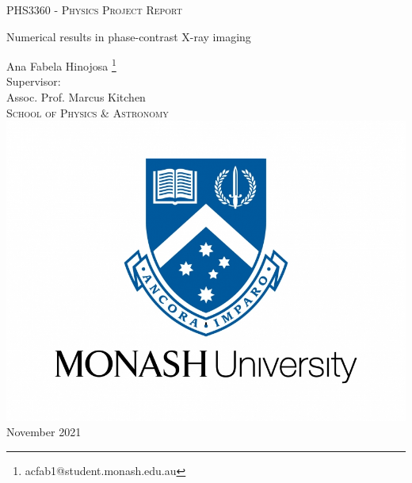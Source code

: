 \documentclass[10pt, a4paper, singlespacing]{report}
\begin{document}
\begin{titlepage}
\begin{center}

\vspace{0.5cm}
\textsc{PHS3360 - Physics Project Report} \\
\vspace{2.5cm}

{\Huge Numerical results in phase-contrast X-ray imaging}
\vspace{3cm}

{\LARGE Ana Fabela Hinojosa \footnote{acfab1@student.monash.edu.au}} \\
\vspace{0.4cm}
{\Large Supervisor:\\ Assoc. Prof. Marcus Kitchen \\}
\textsc{School of Physics \& Astronomy} \\
\vspace{3cm}
\includegraphics[scale=0.2]{logo.jpg} \\ %
\vspace{3cm}
{\LARGE November 2021}\\
\vspace{0.5cm}
\end{center}
\end{titlepage}


\vspace*{0.2\textheight}
\end{document}

